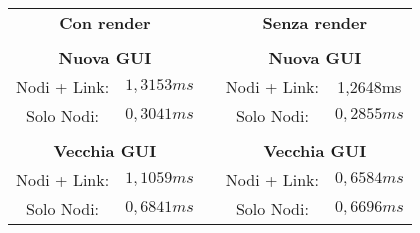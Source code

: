 
\centering
\begin{tabular}{ccccc}
    \multicolumn{2}{c}{\textbf{Con render}} &  & \multicolumn{2}{c}{\textbf{Senza render}} \\
     &  &  &  &  \\ \cline{1-2} \cline{4-5}
    \multicolumn{2}{|c|}{\textbf{Nuova GUI}} & \multicolumn{1}{c|}{} & \multicolumn{2}{c|}{\textbf{Nuova GUI}} \\ \cline{1-2} \cline{4-5}
    \multicolumn{1}{|c|}{Nodi + Link:} & \multicolumn{1}{c|}{$1,3153ms$} & \multicolumn{1}{c|}{} & \multicolumn{1}{c|}{Nodi + Link:} & \multicolumn{1}{c|}{1,2648ms} \\ \cline{1-2} \cline{4-5}
    \multicolumn{1}{|c|}{Solo Nodi:} & \multicolumn{1}{c|}{$0,3041ms$} & \multicolumn{1}{c|}{} & \multicolumn{1}{c|}{Solo Nodi:} & \multicolumn{1}{c|}{$0,2855ms$} \\ \cline{1-2} \cline{4-5}
     &  &  &  &  \\ \cline{1-2} \cline{4-5}
    \multicolumn{2}{|c|}{\textbf{Vecchia GUI}} & \multicolumn{1}{c|}{} & \multicolumn{2}{c|}{\textbf{Vecchia GUI}} \\ \cline{1-2} \cline{4-5}
    \multicolumn{1}{|c|}{Nodi + Link:} & \multicolumn{1}{c|}{$1,1059ms$} & \multicolumn{1}{c|}{} & \multicolumn{1}{c|}{Nodi + Link:} & \multicolumn{1}{c|}{$0,6584ms$} \\ \cline{1-2} \cline{4-5}
    \multicolumn{1}{|c|}{Solo Nodi:} & \multicolumn{1}{c|}{$0,6841ms$} & \multicolumn{1}{c|}{} & \multicolumn{1}{c|}{Solo Nodi:} & \multicolumn{1}{c|}{$0,6696ms$} \\ \cline{1-2} \cline{4-5}
\end{tabular}
